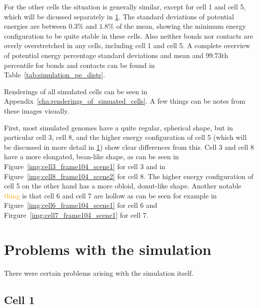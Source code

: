 For the other cells the situation is generally similar, except for cell 1 and cell 5, which will be dicussed separately in \ref{sec:problems_with_the_simulation}. The standard deviations of potential energies are between \(0.3\%\) and \(1.8\%\) of the mean, showing the minimum energy configuration to be quite stable in these cells. Also neither bonds nor contacts are overly overstretched in any cells, including cell 1 and cell 5. A complete overview of potential energy percentage standard deviations and mean and \(99.73\)th percentile for bonds and contacts can be found in Table~\ref{tab:simulation_pe_dists}.

Renderings of all simulated cells can be seen in Appendix~\ref{cha:renderings_of_simuated_cells}. A few things can be notes from these images visually.

First, most simulated genomes have a quite regular, spherical shape, but in particular cell 3, cell 8, and the higher energy configuration of cell 5 (which will be discussed in more detail in \ref{sec:problems_with_the_simulation}) show clear differences from this. Cell 3 and cell 8 have a more elongated, bean-like shape, as can be seen in Figure~\ref{img:cell3_frame104_scene1} for cell 3 and in Figure~\ref{img:cell8_frame104_scene2} for cell 8. The higher energy configuration of cell 5 on the other hand has a more obloid, donut-like shape. Another notable \textcolor{orange}{thing} is that cell 6 and cell 7 are hollow as can be seen for example in Figure~\ref{img:cell6_frame104_scene1} for cell 6 and Firgure~\ref{img:cell7_frame104_scene1} for cell 7.


\section{Problems with the simulation} %
\label{sec:problems_with_the_simulation}

There were certain problems arising with the simulation itself.

\subsection{Cell 1} %
\label{ssub:cell_1}

